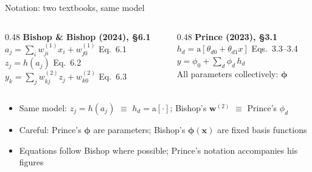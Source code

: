 \documentclass[aspectratio=169, 11pt]{beamer}
\begin{document}
\begin{frame}{Notation: two textbooks, same model}
  {\small
  \begin{columns}[T, onlytextwidth]
    \begin{column}{0.48\textwidth}
      \textbf{Bishop \& Bishop (2024), \S6.1}\\[0.2em]
      $a_j = \sum_{i} w_{ji}^{(1)} x_i + w_{j0}^{(1)}$
      \hfill{\scriptsize Eq.~6.1}\\[0.15em]
      $z_j = h(a_j)$
      \hfill{\scriptsize Eq.~6.2}\\[0.15em]
      $y_k = \sum_{j} w_{kj}^{(2)} z_j + w_{k0}^{(2)}$
      \hfill{\scriptsize Eq.~6.3}
    \end{column}
    \begin{column}{0.48\textwidth}
      \textbf{Prince (2023), \S3.1}\\[0.2em]
      $h_d = \mathrm{a}[\theta_{d0}+\theta_{d1}x]$
      \hfill{\scriptsize Eqs.~3.3--3.4}\\[0.15em]
      $y = \phi_0 + \sum_{d}\phi_d\,h_d$\\[0.15em]
      All parameters collectively: $\bm\phi$
    \end{column}
  \end{columns}}
  \vspace{0.3em}
  \begin{itemize}
    \item Same model: $z_j\!=\!h(a_j)$ $\equiv$
          $h_d\!=\!\mathrm{a}[\cdot]$; \;
          Bishop's $\mathbf{w}^{(2)}$ $\equiv$ Prince's
          $\phi_d$
    \item Careful: Prince's $\bm\phi$ are \alert{parameters};
          Bishop's $\boldsymbol\phi(\mathbf{x})$ are
          \alert{fixed basis functions}
    \item Equations follow Bishop where possible; Prince's
          notation accompanies his figures
  \end{itemize}
\end{frame}
\end{document}
